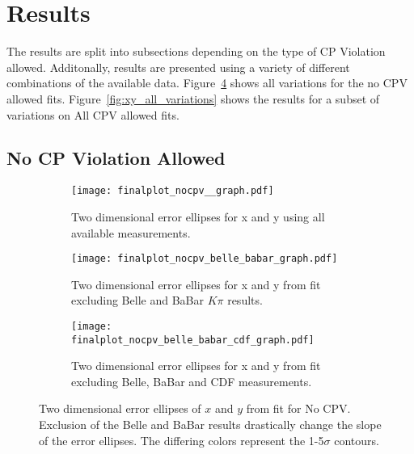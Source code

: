 \section{Results}
\label{sec:Results}
The results are split into subsections depending on the type of CP Violation allowed.
Additonally, results are presented using a variety of different combinations of the
available data. Figure~\ref{fig:xy_nocpv_variations} shows all variations for the 
no CPV allowed fits. Figure~\ref{fig:xy_all_variations} shows the results for a 
subset of variations on All CPV allowed fits. 
\subsection{No CP Violation Allowed}

\begin{figure}[htb]
  \begin{center}
    \begin{subfigure}[b]{0.4\textwidth}
      \centering
      \texttt{[image: finalplot\_nocpv\_\_graph.pdf]}
      \caption{Two dimensional error ellipses for x and y using all available measurements.}
      \label{fig:xy_no_cpv_}
    \end{subfigure}%

    \begin{subfigure}[b]{0.4\textwidth}
      \centering
      \texttt{[image: finalplot\_nocpv\_belle\_babar\_graph.pdf]}
      \caption{Two dimensional error ellipses for x and y from fit excluding Belle and BaBar $K\pi$ results.}
      \label{fig:xy_no_cpv_nobelle_babar}
    \end{subfigure}%
    \hspace{2mm}
    \begin{subfigure}[b]{0.4\textwidth}
      \centering
      \texttt{[image: finalplot\_nocpv\_belle\_babar\_cdf\_graph.pdf]}
      \caption{Two dimensional error ellipses for x and y from fit excluding Belle, BaBar and CDF measurements.}
      \label{fig:xy_no_cpv_nocdf}
    \end{subfigure}%
  \end{center}
  \caption{Two dimensional error ellipses of $x$ and $y$ from fit for No CPV. Exclusion of the Belle and BaBar results drastically change the slope of the error ellipses. The differing colors represent the 1-5$\sigma$ contours.}
  \label{fig:xy_nocpv_variations}
\end{figure}


